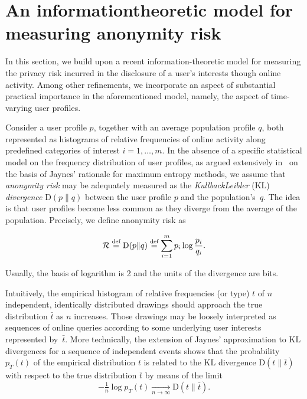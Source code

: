 \section{An information\hyph theoretic model for measuring anonymity risk}
\label{sec:1-1}

\noindent
In this section, we build upon a recent information-theoretic model for measuring the privacy risk incurred in the disclosure of a user's interests though online activity. Among other refinements, we incorporate an aspect of substantial practical importance in the aforementioned model, namely, the aspect of time-varying user profiles.
 
Consider a user profile $p$, together with an average population profile $q$, both represented as histograms of relative frequencies of online activity along predefined categories of interest $i=1,\dots,m$. In the absence of a specific statistical model on the frequency distribution of user profiles, as argued extensively in~\cite{rebollo2010optimized,Rebollo11SecTech,Parra14FGCS} on the basis of Jaynes' rationale for maximum entropy methods, we assume that \emph{anonymity risk} may be adequately measured as the \emph{Kullback\hyph Leibler} (KL) \emph{divergence} $\mathrm{D}(p\|q)$ between the user profile $p$ and the population's~$q$. The idea is that user profiles become less common as they diverge from the average of the population. Precisely, we define anonymity risk as

\begin{equation*}
\mathcal{R}\stackrel{\text{def}}{=}\mathrm{D}(p\|q)\stackrel{\text{def}}{=}\sum_{i=1}^m p_i\log \frac{p_i}{q_i}.
\end{equation*}

Usually, the basis of logarithm is 2 and the units of the divergence are bits.

Intuitively, the empirical histogram of relative frequencies (or type) $t$ of $n$ independent, identically distributed drawings should approach the true distribution $\bar{t}$ as $n$ increases. Those drawings may be loosely interpreted as sequences of online queries according to some underlying user interests represented by~$\bar{t}$. More technically, the extension of Jaynes' approximation to KL divergences for a sequence of independent events shows that the probability $p_T(t)$ of the empirical distribution $t$ is related to the KL divergence $\mathrm{D}(t\|\bar{t})$ with respect to the true distribution $\bar{t}$ by means of the limit
\begin{equation*}
-\tfrac{1}{n}\log p_T(t)\xrightarrow[n\to\infty]{}\mathrm{D}(t\|\bar{t}).
\end{equation*}

